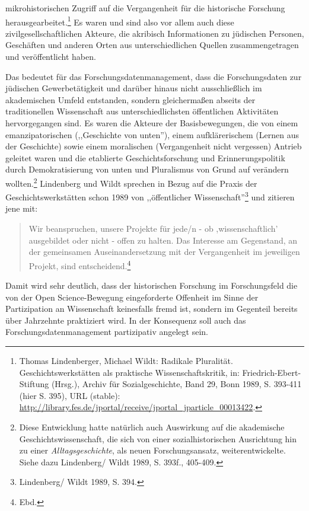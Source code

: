mikrohistorischen Zugriff auf die Vergangenheit für die historische Forschung herausgearbeitet.\footnote{Thomas Lindenberger, Michael Wildt: Radikale Pluralität. Geschichtswerkstätten als praktische Wissenschaftskritik, in: Friedrich-Ebert-Stiftung (Hrsg.), Archiv für Sozialgeschichte, Band 29, Bonn 1989, S. 393-411 (hier S. 395), URL (stable): \url{http://library.fes.de/jportal/receive/jportal_jparticle_00013422}.} Es waren und sind also vor allem auch diese zivilgesellschaftlichen Akteure, die akribisch Informationen zu jüdischen Personen, Geschäften und anderen Orten aus unterschiedlichen Quellen zusammengetragen und veröffentlicht haben.

Das bedeutet für das Forschungsdatenmanagement, dass die Forschungsdaten zur jüdischen Gewerbetätigkeit und darüber hinaus nicht ausschließlich im akademischen Umfeld entstanden, sondern gleichermaßen abseits der traditionellen Wissenschaft aus unterschiedlichsten öffentlichen Aktivitäten hervorgegangen sind. Es waren die Akteure der Basisbewegungen, die von einem emanzipatorischen (,,Geschichte von unten''), einem aufklärerischem (Lernen aus der Geschichte) sowie einem moralischen (Vergangenheit nicht vergessen) Antrieb geleitet waren und die etablierte Geschichtsforschung und Erinnerungspolitik durch Demokratisierung von unten und Pluralismus von Grund auf verändern wollten.\footnote{Diese Entwicklung hatte natürlich auch Auswirkung auf die akademische Geschichtswissenschaft, die sich von einer sozialhistorischen Ausrichtung hin zu einer \textit{Alltagsgeschichte}, als neuen Forschungsansatz, weiterentwickelte. Siehe dazu Lindenberg/ Wildt 1989, S. 393f., 405-409.} Lindenberg und Wildt sprechen in Bezug auf die Praxis der Geschichtswerkstätten schon 1989 von ,,öffentlicher Wissenschaft''\footnote{Lindenberg/ Wildt 1989, S. 394.} und zitieren jene mit:

\begin{quote}
    Wir beanspruchen, unsere Projekte für jede/n - ob ,wissenschaftlich' ausgebildet oder nicht - offen zu halten. Das Interesse am Gegenstand, an der gemeinsamen Auseinandersetzung mit der Vergangenheit im jeweiligen Projekt, sind entscheidend.\footnote{Ebd.}
\end{quote}

Damit wird sehr deutlich, dass der historischen Forschung im Forschungsfeld die von der Open Science-Bewegung eingeforderte Offenheit im Sinne der Partizipation an Wissenschaft keinesfalls fremd ist, sondern im Gegenteil bereits über Jahrzehnte praktiziert wird. In der Konsequenz soll auch das Forschungsdatenmanagement partizipativ angelegt sein.

